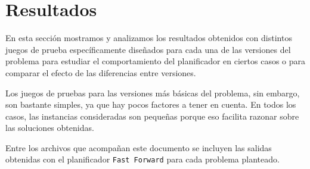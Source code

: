 
\section{Resultados} \label{sec:resultados}

En esta sección mostramos y analizamos los resultados obtenidos con distintos 
juegos de prueba específicamente diseñados para cada una de las versiones 
del problema para estudiar el comportamiento del planificador en ciertos casos 
o para comparar el efecto de las diferencias entre versiones. 

Los juegos de pruebas para las versiones más básicas del problema, sin 
embargo, son bastante simples, ya que hay pocos factores a tener en cuenta. 
En todos los casos, las instancias consideradas son pequeñas porque eso 
facilita razonar sobre las soluciones obtenidas.

Entre los archivos que acompañan este documento se incluyen las salidas 
obtenidas con el planificador \texttt{Fast Forward} para cada problema 
planteado.















\clearpage


